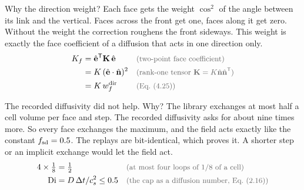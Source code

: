 \begin{qabox}{Why the direction weight?}
\explain Each face gets the weight $\cos^2$ of the angle between its link and the vertical. Faces
across the front get one, faces along it get zero. Without the weight the correction roughens the
front sideways. This weight is exactly the face coefficient of a diffusion that acts in one
direction only.
\derive
\begin{align*}
K_f &= \hat{\mathbf{e}}^{\mathsf{T}}\mathbf{K}\,\hat{\mathbf{e}} \why{two-point face coefficient} \\
    &= K\,(\hat{\mathbf{e}}\cdot\hat{\mathbf{n}})^2 \why{rank-one tensor $\mathbf{K} = K\hat{\mathbf{n}}\hat{\mathbf{n}}^{\mathsf{T}}$} \\
    &= K\,w^{\mathrm{dir}}_f \why{Eq.~(4.25)}
\end{align*}
\end{qabox}

\begin{qabox}{The recorded diffusivity did not help. Why?}
\explain The library exchanges at most half a cell volume per face and step. The recorded
diffusivity asks for about nine times more. So every face exchanges the maximum, and the field acts
exactly like the constant $f_{\mathrm{sd}} = 0.5$. The replays are bit-identical, which proves it. A shorter
step or an implicit exchange would let the field act.
\derive
\begin{align*}
4 \times \tfrac18 &= \tfrac12 \why{at most four loops of 1/8 of a cell} \\
\mathrm{Di} &= D\,\Delta t/c_s^{2} \le 0.5 \why{the cap as a diffusion number, Eq.~(2.16)}
\end{align*}
\end{qabox}

